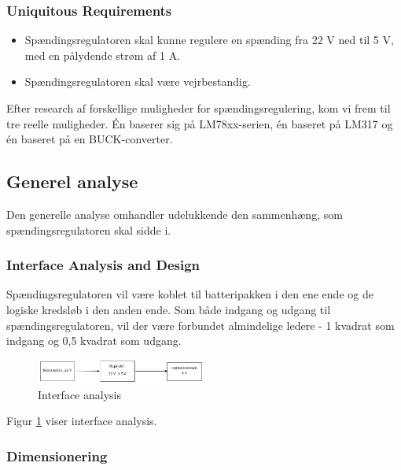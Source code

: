 \subsubsection{Uniquitous Requirements}
\label{sec:kravsspecifikation-3}

\begin{itemize}
\item Spændingsregulatoren skal kunne regulere en spænding fra 22 V ned til 5 V, med en pålydende strøm af 1 A. 
\item Spændingsregulatoren skal være vejrbestandig.
\end{itemize}

Efter research af forskellige muligheder for spændingsregulering, kom vi frem til tre reelle muligheder. Én baserer sig på LM78xx-serien, én baseret på LM317 og én baseret på en BUCK-converter.

\subsection{Generel analyse}
\label{sec:generel-analyse-}

Den generelle analyse omhandler udelukkende den sammenhæng, som spændingsregulatoren skal sidde i.

\subsubsection{Interface Analysis and Design}
\label{sec:generel-analyse}

Spændingsregulatoren vil være koblet til batteripakken i den ene ende og de logiske kredsløb i den anden ende. Som både indgang og udgang til spændingsregulatoren, vil der være forbundet almindelige ledere - 1 kvadrat som indgang og 0,5 kvadrat som udgang.

\begin{figure}[h]
  \centering
  \includegraphics[width=0.5\textwidth]{./figurer/j1.png}
  \caption{Interface analysis}
  \label{fig:j1}
\end{figure}

Figur \ref{fig:j1} viser interface analysis.

\subsubsection{Dimensionering}
\label{sec:generel-analyse-1}

